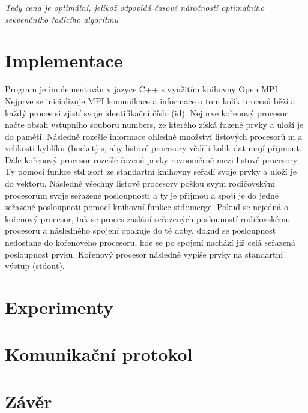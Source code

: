 \documentclass[12pt, a4paper]{article}
\begin{document}
\textit{Tedy cena je optimální, jelikož odpovídá časové náročnosti optimalního sekvenčního řadícího algoritmu}

\section{Implementace}
Program je implementován v jazyce C++ s využitím knihovny Open MPI. Nejprve se inicializuje MPI komunikace a informace o tom kolik procesů běží a každý proces si zjistí svoje identifikační číslo (id). Nejprve kořenový procesor načte obsah vstupního souboru numbers, ze kterého získá řazené prvky a uloží je do paměti. Následně rozešle informace ohledně množství listových procesorů m a velikosti kyblíku (bucket) s, aby listové procesory věděli kolik dat mají přijmout. Dále kořenový procesor rozešle řazené prvky rovnoměrně mezi listové procesory. Ty pomocí funkce std::sort ze standartní knihovny seřadí svoje prvky a uloží je do vektoru. Následně všechny listové procesory pošlou svým rodičovským procesorům svoje seřazené posloupnosti a ty je přijmou a spojí je do jedné seřazené posloupnoti pomocí knihovní funkce std::merge. Pokud se nejedná o kořenový procesor, tak se proces zaslání seřazených poslouností rodičovskému procesorů a následného spojení opakuje do té doby, dokud se posloupnost nedostane do kořenového procesoru, kde se po spojení nachází již celá seřazená posloupnost prvků. Kořenový procesor následně vypíše prvky na standartní výstup (stdout).

\section{Experimenty}

\section{Komunikační protokol}

\section{Závěr}
\end{document}
